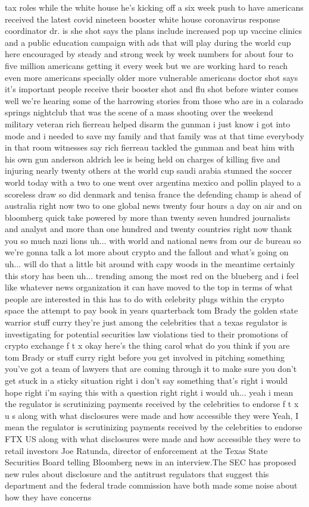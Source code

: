\documentclass{article}%
\begin{document}
tax roles while the white house he's kicking off a six week push to have americans received the latest covid nineteen booster white house coronavirus response coordinator dr. is she shot says the plans include increased pop up vaccine clinics and a public education campaign with ads that will play during the world cup here encouraged by steady and strong week by week numbers for about four to five million americans getting it every week but we are working hard to reach even more americans specially older more vulnerable americans doctor shot says it's important people receive their booster shot and flu shot before winter comes well we're hearing some of the harrowing stories from those who are in a colarado springs nightclub that was the scene of a mass shooting over the weekend military veteran rich fierreau helped disarm the gunman i just know i got into mode and i needed to save my family and that family was at that time everybody in that room witnesses say rich fierreau tackled the gunman and beat him with his own gun anderson aldrich lee is being held on charges of killing five and injuring nearly twenty others at the world cup saudi arabia stunned the soccer world today with a two to one went over argentina mexico and pollin played to a scoreless draw so did denmark and tenisa france the defending champ is ahead of australia right now two to one global news twenty four hours a day on air and on bloomberg quick take powered by more than twenty seven hundred journalists and analyst and more than one hundred and twenty countries right now thank you so much nazi lions uh... with world and national news from our dc bureau so we're gonna talk a lot more about crypto and the fallout and what's going on uh... will do that a little bit around with capy woods in the meantime certainly this story has been uh... trending among the most red on the blueberg and i feel like whatever news organization it can have moved to the top in terms of what people are interested in this has to do with celebrity plugs within the crypto space the attempt to pay book in years quarterback tom Brady the golden state warrior stuff curry they're just among the celebrities that a texas regulator is investigating for potential securities law violations tied to their promotions of crypto exchange f t x okay here's the thing carol what do you think if you are tom Brady or stuff curry right before you get involved in pitching something you've got a team of lawyers that are coming through it to make sure you don't get stuck in a sticky situation right i don't say something that's right i would hope right i'm saying this with a question right right i would uh... yeah i mean the regulator is scrutinizing payments received by the celebrities to endorse f t x u s along with what disclosures were made and how accessible they were  Yeah, I mean the regulator is scrutinizing payments received by the celebrities to endorse FTX US along with what disclosures were made and how accessible they were to retail investors Joe Ratunda, director of enforcement at the Texas State Securities Board telling Bloomberg news in an interview.The SEC has proposed new rules about disclosure and the antitrust regulators that suggest this department and the federal trade commission have both made some noise about how they have concerns 
\end{document}
